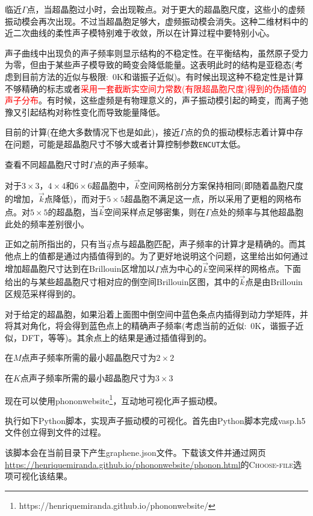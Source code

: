 临近$\Gamma$点，当超晶胞过小时，会出现鞍点。对于更大的超晶胞尺度，这些小的虚频振动模会再次出现。不过当超晶胞足够大，虚频振动模会消失。这种二维材料中的近二次曲线的柔性声子模特别难于收敛，所以在计算过程中要特别小心。

声子曲线中出现负的声子频率则显示结构的不稳定性。在平衡结构，虽然原子受力为零，但由于某些声子模导致的畸变会降低能量。这表明此时的结构是亚稳态(考虑到目前方法的近似与极限:~\textrm{0K}和谐振子近似)。有时候出现这种不稳定性是计算不够精确的标志或者\textcolor{red}{采用一套截断实空间力常数(有限超晶胞尺度)得到的伪插值的声子分布}。有时候，这些虚频是有物理意义的，声子振动模引起的畸变，而离子弛豫又引起结构对称性变化而导致能量降低。

目前的计算(在绝大多数情况下也是如此)，接近$\Gamma$点的负的振动模标志着计算中存在问题，可能是超晶胞尺寸不够大或者计算控制参数\texttt{ENCUT}太低。

查看不同超晶胞尺寸时$\Gamma$点的声子频率。

对于$3\times3$，$4\times4$和$6\times6$超晶胞中，$\vec k$空间网格剖分方案保持相同(即随着晶胞尺度的增加，$\vec k$点降低)，而对于$5\times5$超晶胞不满足这一点，所以采用了更粗的网格布点。对$5\times5$的超晶胞，当$\vec k$空间采样点足够密集，则在$\Gamma$点处的频率与其他超晶胞此处的频率差别很小。

正如之前所指出的，只有当$\vec q$点与超晶胞匹配，声子频率的计算才是精确的。而其他点上的值都是通过内插值得到的。为了更好地说明这个问题，这里给出如何通过增加超晶胞尺寸达到在\textrm{Brillouin}区增加以$\Gamma$点为中心的$\vec k$空间采样的网格点。下面给出的与某些超晶胞尺寸相对应的倒空间\textrm{Brillouin}区图，其中的$\vec k$点是由\textrm{Brillouin}区规范采样得到的。

对于给定的超晶胞，如果沿着上面图中倒空间中蓝色条点内插得到动力学矩阵，并将其对角化，将会得到蓝色点上的精确声子频率(考虑当前的近似:~\textrm{0K}，谐振子近似，\textrm{DFT}，等等)。其余点上的结果是通过插值得到的。

在$M$点声子频率所需的最小超晶胞尺寸为$2\times2$

在$K$点声子频率所需的最小超晶胞尺寸为$3\times3$

现在可以使用\textrm{phononwebsite}\footnote{https://henriquemiranda.github.io/phononwebsite/}，互动地可视化声子振动模。

执行如下\textrm{Python}脚本，实现声子振动模的可视化。首先由\textrm{Python}脚本完成\textrm{vasp.h5}文件创立得到文件的过程。

该脚本会在当前目录下产生\textrm{graphene.json}文件。下载该文件并通过网页\textrm{\url{https://henriquemiranda.github.io/phononwebsite/phonon.html}}的\textsc{Choose-file}选项可视化该结果。

